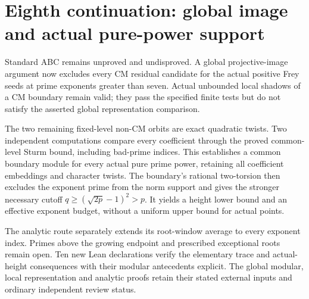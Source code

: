 \section{Eighth continuation: global image and actual pure-power support}

Standard ABC remains unproved and undisproved. A global projective-image
argument now excludes every CM residual candidate for the actual positive
Frey seeds at prime exponents greater than seven. Actual unbounded local
shadows of a CM boundary remain valid; they pass the specified finite
tests but do not satisfy the asserted global representation comparison.

The two remaining fixed-level non-CM orbits are exact quadratic twists.
Two independent computations compare every coefficient through the proved
common-level Sturm bound, including bad-prime indices. This establishes a
common boundary module for every actual pure prime power, retaining all
coefficient embeddings and character twists. The boundary's rational
two-torsion then excludes the exponent prime from the norm support and
gives the stronger necessary cutoff $q\ge(\sqrt{2p}-1)^2>p$.
It yields a height lower bound and an effective exponent budget, without
a uniform upper bound for actual points.

The analytic route separately extends its root-window average to every
exponent index. Primes above the growing endpoint and prescribed exceptional
roots remain open. Ten new Lean declarations verify the elementary trace
and actual-height consequences with their modular antecedents explicit.
The global modular, local representation and analytic proofs retain their
stated external inputs and ordinary independent review status.
